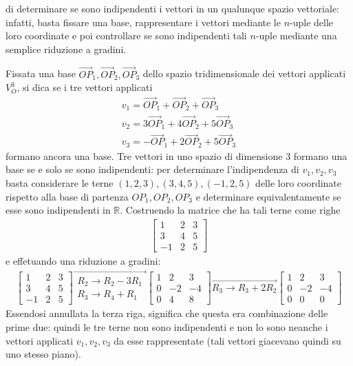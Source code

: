 di determinare se sono indipendenti i vettori in un qualunque spazio
vettoriale: infatti, basta fissare una base, rappresentare i vettori
mediante le $n$-uple delle loro coordinate e poi controllare se sono
indipendenti tali $n$-uple mediante una semplice riduzione a gradini.
\begin{es}
  Fissata una base $\vec{OP}_1,\vec{OP}_2,\vec{OP}_3$ dello spazio
  tridimensionale dei vettori applicati $V_O^3$, si dica se i tre vettori
  applicati
  \begin{eqnarray*}
    v_1=\vec{OP}_1+\vec{OP}_2+\vec{OP}_3\\
    v_2=3\vec{OP}_1+4\vec{OP}_2+5\vec{OP}_3\\
    v_3=-\vec{OP}_1+2\vec{OP}_2+5\vec{OP}_3
  \end{eqnarray*}
  formano ancora una base.
  Tre vettori in uno spazio di dimensione 3 formano una base se e solo se
  sono indipendenti: per determinare l'indipendenza di $v_1,v_2,v_3$ basta
  considerare le terne $(1,2,3),(3,4,5),(-1,2,5)$ delle loro coordinate
  rispetto alla base di partenza $OP_1,OP_2,OP_3$ e determinare
  equivalentamente se esse sono indipendenti in $\mathds{R}$.
  \clearpage
  Costruendo la matrice che ha tali terne come righe
  \begin{eqnarray*}
    \begin{bmatrix}
      1 & 2 & 3\\
      3 & 4 & 5\\
      -1 & 2 & 5
    \end{bmatrix}
  \end{eqnarray*}
  e effetuando una riduzione a gradini:
  \begin{eqnarray*}
    \begin{bmatrix}
      1 & 2 & 3\\
      3 & 4 & 5\\
      -1 & 2 & 5
    \end{bmatrix}\overrightarrow{
    \begin{matrix}
      R_2\to R_2-3R_1\\
      R_3\to R_4+R_1
    \end{matrix}
    }
    \begin{bmatrix}
      1 & 2 & 3\\
      0 & -2 & -4\\
      0 & 4 & 8
    \end{bmatrix}
    \overrightarrow{R_3\to R_3+2R_2}
    \begin{bmatrix}
      1 & 2 & 3\\
      0 & -2 & -4\\
      0 & 0 & 0
    \end{bmatrix}
  \end{eqnarray*}
  Essendosi annullata la terza riga, significa che questa era
  combinazione delle prime due: quindi le tre terne non sono indipendenti
  e non lo sono neanche i vettori applicati $v_1,v_2,v_3$ da esse
  rappresentate (tali vettori giacevano quindi su uno stesso piano).
\end{es}


